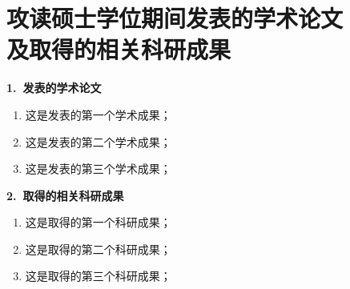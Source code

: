 
\chapter[攻读硕士学位期间发表的学术论文及取得的相关科研成果]
{攻读硕士学位期间发表的学术论文\\及取得的相关科研成果}

\noindent\songti\xiaosi\textbf{1.\ 发表的学术论文} 

\begin{enumerate}[label=(\arabic*)]
    \item 这是发表的第一个学术成果；
    \item 这是发表的第二个学术成果；
    \item 这是发表的第三个学术成果；
\end{enumerate}

\noindent \textbf{2.\ 取得的相关科研成果}

\begin{enumerate}[label=(\arabic*)]
    \item 这是取得的第一个科研成果；
    \item 这是取得的第二个科研成果；
    \item 这是取得的第三个科研成果；
\end{enumerate}
